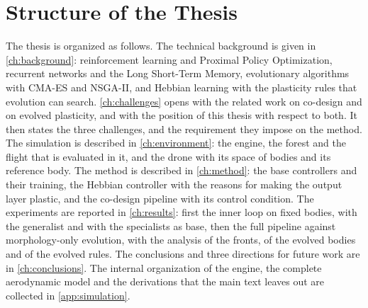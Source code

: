 \section{Structure of the Thesis}
\label{sec:intro-structure}

The thesis is organized as follows. The technical background is given in \autoref{ch:background}: reinforcement learning and Proximal Policy Optimization, recurrent networks and the Long Short-Term Memory, evolutionary algorithms with CMA-ES and NSGA-II, and Hebbian learning with the plasticity rules that evolution can search. \autoref{ch:challenges} opens with the related work on co-design and on evolved plasticity, and with the position of this thesis with respect to both. It then states the three challenges, and the requirement they impose on the method. The simulation is described in \autoref{ch:environment}: the engine, the forest and the flight that is evaluated in it, and the drone with its space of bodies and its reference body. The method is described in \autoref{ch:method}: the base controllers and their training, the Hebbian controller with the reasons for making the output layer plastic, and the co-design pipeline with its control condition. The experiments are reported in \autoref{ch:results}: first the inner loop on fixed bodies, with the generalist and with the specialists as base, then the full pipeline against morphology-only evolution, with the analysis of the fronts, of the evolved bodies and of the evolved rules. The conclusions and three directions for future work are in \autoref{ch:conclusions}. The internal organization of the engine, the complete aerodynamic model and the derivations that the main text leaves out are collected in \autoref{app:simulation}.
